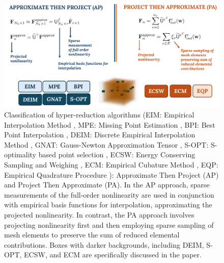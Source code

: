\documentclass[11pt]{article}
\begin{document}
\begin{figure}[t]
    \centering
    \includegraphics[width=\linewidth]{ATP_PTA2.pdf}
    \caption{Classification of hyper-reduction algorithms \protect\footnotemark(EIM: Empirical Interpolation Method \cite{barrault2004empirical}, MPE: Missing Point Estimation \cite{astrid2008missing}, BPI: Best Point Interpolation \cite{nguyen2007best}, DEIM: Discrete Empirical Interpolation Method \cite{chaturantabut2010nonlinear}, GNAT: Gauss-Newton Approximation Tensor \cite{carlberg2011efficient}, S-OPT: S-optimality based point selection \cite{lauzon2024s-opt}, ECSW: Energy Conserving Sampling and Weighing \cite{farhat2014dimensional}, ECM: Empirical Cubature Method \cite{hernandez2017dimensional}, EQP: Empirical Quadrature Procedure \cite{Patera_2017_EQP}): Approximate Then Project (AP) and Project Then Approximate (PA). In the AP approach, sparse measurements of the full-order nonlinearity are used in conjunction with empirical basis functions for interpolation, approximating the projected nonlinearity. In contrast, the PA approach involves projecting nonlinearity first and then employing sparse sampling of mesh elements to preserve the sum of reduced elemental contributions. Boxes with darker backgrounds, including DEIM, S-OPT, ECSW, and ECM are specifically discussed in the paper.}
    \label{fig:hyp_algo}
\end{figure}
\end{document}
